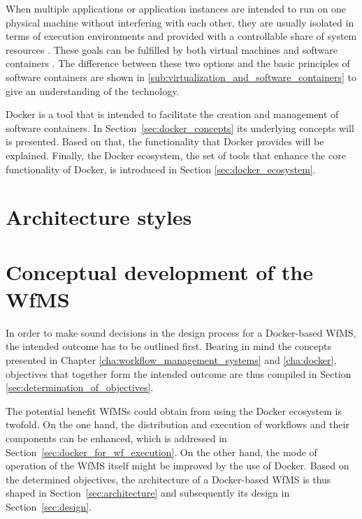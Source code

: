\documentclass[language=english,noinputenc]{wiwwuwordrprt}
\begin{document}
    When multiple applications or application instances are intended to run on one physical machine without interfering with each other, they are usually isolated in terms of execution environments and provided with a controllable share of system resources \cite{Felter2014Updated}. These goals can be fulfilled by both virtual machines and software containers \cite{Ruiz2015Performance}. The difference between these two options and the basic principles of software containers are shown in \ref{sub:virtualization_and_software_containers} to give an understanding of the technology.

    Docker is a tool that is intended to facilitate the creation and management of software containers. In Section~\ref{sec:docker_concepts} its underlying concepts will is presented. Based on that, the functionality that Docker provides will be explained. Finally, the Docker ecosystem, \ie the set of tools that enhance the core functionality of Docker, is introduced in Section \ref{sec:docker_ecosystem}.

    

  \chapter{Architecture styles} %
  \label{cha:architecture_styles}
    


  \chapter{Conceptual development of the WfMS} %
    \label{cha:solution_design}

    In order to make sound decisions in the design process for a Docker-based \ac{WfMS}, the intended outcome has to be outlined first. Bearing in mind the concepts presented in Chapter \ref{cha:workflow_management_systems} and \ref{cha:docker}, objectives that together form the intended outcome are thus compiled in Section \ref{sec:determination_of_objectives}.

    The potential benefit \acp{WfMS} could obtain from using the Docker ecosystem is twofold.
    On the one hand, the distribution and execution of workflows and their components can be enhanced, which is addressed in Section~\ref{sec:docker_for_wf_execution}.
    On the other hand, the mode of operation of the \ac{WfMS} itself might be improved by the use of Docker.
    Based on the determined objectives, the architecture of a Docker-based \ac{WfMS} is thus shaped in Section~\ref{sec:architecture} and subsequently its design in Section~\ref{sec:design}.
\end{document}
